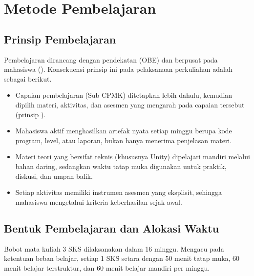 
\section{Metode Pembelajaran}

\subsection{Prinsip Pembelajaran}

Pembelajaran dirancang dengan pendekatan 
(OBE) dan berpusat pada mahasiswa ().
Konsekuensi prinsip ini pada pelaksanaan perkuliahan adalah sebagai berikut.

\begin{itemize}
  \item Capaian pembelajaran (Sub-CPMK) ditetapkan lebih dahulu, kemudian
        dipilih materi, aktivitas, dan asesmen yang mengarah pada capaian
        tersebut (prinsip ).
  \item Mahasiswa aktif menghasilkan artefak nyata setiap minggu berupa kode
        program, level, atau laporan, bukan hanya menerima penjelasan materi.
  \item Materi teori yang bersifat teknis (khususnya Unity) dipelajari
        mandiri melalui bahan daring, sedangkan waktu tatap muka digunakan
        untuk praktik, diskusi, dan umpan balik.
  \item Setiap aktivitas memiliki instrumen asesmen yang eksplisit, sehingga
        mahasiswa mengetahui kriteria keberhasilan sejak awal.
\end{itemize}

\subsection{Bentuk Pembelajaran dan Alokasi Waktu}

Bobot mata kuliah 3 SKS dilaksanakan dalam 16 minggu. Mengacu pada ketentuan
beban belajar, setiap 1 SKS setara dengan 50 menit tatap muka, 60 menit belajar
terstruktur, dan 60 menit belajar mandiri per minggu.

